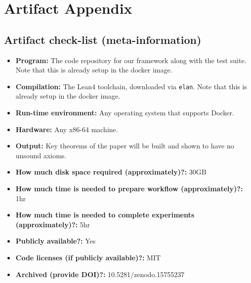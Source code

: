 \documentclass[onecolumn, sigconf]{acmart}
\begin{document}


\appendix
\section{Artifact Appendix}



\subsection{Artifact check-list (meta-information)}


{\small
\begin{itemize}
  \item {\bf Program: } The code repository for our framework along with the test suite. Note that this is already setup in the docker image.
  \item {\bf Compilation: } The Lean4 toolchain, downloaded via \texttt{elan}. Note that this is already setup in the docker image.
  \item {\bf Run-time environment: } Any operating system that supports Docker.
  \item {\bf Hardware: } Any x86-64 machine.
  \item {\bf Output: } Key theorems of the paper will be built and shown to have no unsound axioms.
  \item {\bf How much disk space required (approximately)?: } 30GB
  \item {\bf How much time is needed to prepare workflow (approximately)?: } 1hr
  \item {\bf How much time is needed to complete experiments (approximately)?: } 5hr
  \item {\bf Publicly available?: } Yes
  \item {\bf Code licenses (if publicly available)?: } MIT
  \item {\bf Archived (provide DOI)?: } 10.5281/zenodo.15755237
\end{itemize}
}
\end{document}
